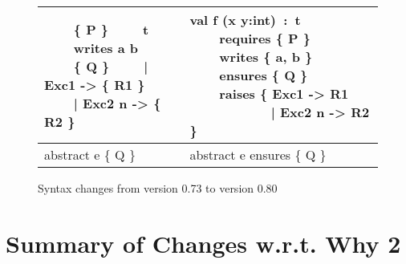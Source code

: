 \documentclass[a4paper,11pt,twoside,openright]{memoir}
\begin{document}
\begin{figure}[thbp]
\begin{tabular}{|p{}|p{}|}
\null~~~~\{ P \} \newline
\null~~~~t \newline
\null~~~~writes a b \newline
\null~~~~\{ Q \} \newline
\null~~~~| Exc1 -> \{ R1 \} \newline
\null~~~~| Exc2 n -> \{ R2 \}
&
\ttfamily
val f (x y:int)~:~t \newline
\null~~~~requires \{ P \} \newline
\null~~~~writes \{ a, b \} \newline
\null~~~~ensures \{ Q \} \newline
\null~~~~raises \{ Exc1 -> R1 \newline
\null~~~~~~~~~~~| Exc2 n -> R2 \}
\\
\hline
\ttfamily
abstract e \{ Q \}
&
\ttfamily
abstract e ensures \{ Q \}
\\
\hline
\end{tabular}
\caption{Syntax changes from version 0.73 to version 0.80}
\label{fig:syntax080}
\end{figure}

\section{Summary of Changes w.r.t. Why 2}
\end{document}
